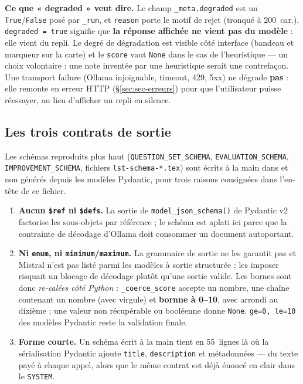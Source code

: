 \textbf{Ce que « degraded » veut dire.} Le champ \texttt{\_meta.degraded} est un
\texttt{True}/\texttt{False} posé par \texttt{\_run}, et \texttt{reason} porte le
motif de rejet (tronqué à 200~car.). \texttt{degraded = true} signifie que
\textbf{la réponse affichée ne vient pas du modèle} : elle vient du repli. Le
degré de dégradation est visible côté interface (bandeau et marqueur sur la
carte) et le \texttt{score} vaut \texttt{None} dans le cas de l'heuristique ---
un choix volontaire : une note inventée par une heuristique serait une
contrefaçon. Une transport failure (Ollama injoignable, timeout, 429, 5xx) ne
dégrade \textbf{pas} : elle remonte en erreur HTTP (§\ref{sec:sec-erreurs}) pour
que l'utilisateur puisse réessayer, au lieu d'afficher un repli en silence.

\subsection{Les trois contrats de sortie}
\label{sec:prompts-schemas}

Les schémas reproduits plus haut (\texttt{QUESTION\_SET\_SCHEMA},
\texttt{EVALUATION\_SCHEMA}, \texttt{IMPROVEMENT\_SCHEMA}, fichiers
\texttt{lst-schema-*.tex}) sont écrits à la main dans
 et non générés depuis les modèles Pydantic, pour trois
raisons consignées dans l'en-tête de ce fichier.

\begin{enumerate}[label=\textbf{R\arabic*.},leftmargin=3.6em,itemsep=2pt]
  \item \textbf{Aucun \texttt{\$ref} ni \texttt{\$defs}.} La sortie de
        \texttt{model\_json\_schema()} de Pydantic v2 factorise les sous-objets par
        référence ; le schéma est aplati ici parce que la contrainte de décodage
        d'Ollama doit consommer un document autoportant.
  \item \textbf{Ni \texttt{enum}, ni \texttt{minimum}/\texttt{maximum}.} La
        grammaire de sortie ne les garantit pas et Mistral n'est pas listé parmi
        les modèles à sortie structurée ; les imposer risquait un blocage de
        décodage plutôt qu'une sortie valide. Les bornes sont donc
        \emph{re-calées côté Python} : \texttt{\_coerce\_score} accepte un nombre,
        une chaîne contenant un nombre (avec virgule) et \textbf{bornne à 0--10},
        avec arrondi au dixième ; une valeur non récupérable ou booléenne donne
        \texttt{None}. \texttt{ge=0, le=10} des modèles Pydantic reste la
        validation finale.
  \item \textbf{Forme courte.} Un schéma écrit à la main tient en 55~lignes là où
        la sérialisation Pydantic ajoute \texttt{title}, \texttt{description} et
        métadonnées --- du texte payé à chaque appel, alors que le même contrat est
        déjà énoncé en clair dans le \texttt{SYSTEM}.
\end{enumerate}

